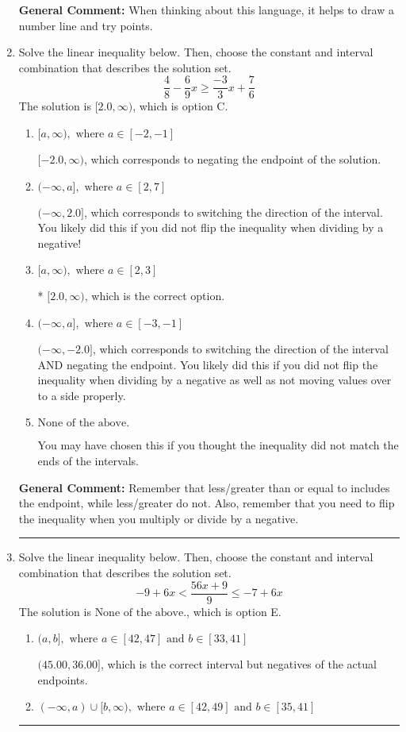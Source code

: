 \documentclass{extbook}[14pt]
\newcommand{\litem}[1]{\item #1

\rule{\textwidth}{0.4pt}}
\begin{document}
\begin{enumerate}
{\textbf{General Comment:} When thinking about this language, it helps to draw a number line and try points.
}
\litem{
Solve the linear inequality below. Then, choose the constant and interval combination that describes the solution set.
\[ \frac{4}{8} - \frac{6}{9} x \geq \frac{-3}{3} x + \frac{7}{6} \]The solution is \( [2.0, \infty) \), which is option C.\begin{enumerate}[label=\Alph*.]
\item \( [a, \infty), \text{ where } a \in [-2, -1] \)

 $[-2.0, \infty)$, which corresponds to negating the endpoint of the solution.
\item \( (-\infty, a], \text{ where } a \in [2, 7] \)

 $(-\infty, 2.0]$, which corresponds to switching the direction of the interval. You likely did this if you did not flip the inequality when dividing by a negative!
\item \( [a, \infty), \text{ where } a \in [2, 3] \)

* $[2.0, \infty)$, which is the correct option.
\item \( (-\infty, a], \text{ where } a \in [-3, -1] \)

 $(-\infty, -2.0]$, which corresponds to switching the direction of the interval AND negating the endpoint. You likely did this if you did not flip the inequality when dividing by a negative as well as not moving values over to a side properly.
\item \( \text{None of the above}. \)

You may have chosen this if you thought the inequality did not match the ends of the intervals.
\end{enumerate}

\textbf{General Comment:} Remember that less/greater than or equal to includes the endpoint, while less/greater do not. Also, remember that you need to flip the inequality when you multiply or divide by a negative.
}
\litem{
Solve the linear inequality below. Then, choose the constant and interval combination that describes the solution set.
\[ -9 + 6 x < \frac{56 x + 9}{9} \leq -7 + 6 x \]The solution is \( \text{None of the above.} \), which is option E.\begin{enumerate}[label=\Alph*.]
\item \( (a, b], \text{ where } a \in [42, 47] \text{ and } b \in [33, 41] \)

$(45.00, 36.00]$, which is the correct interval but negatives of the actual endpoints.
\item \( (-\infty, a) \cup [b, \infty), \text{ where } a \in [42, 49] \text{ and } b \in [35, 41] \)


\end{enumerate}}
\end{enumerate}
\end{document}
